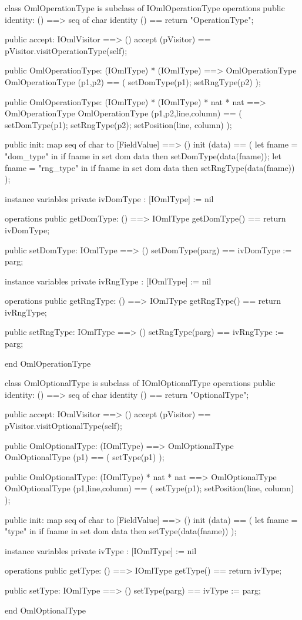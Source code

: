 \begin{vdm_al}
class OmlOperationType is subclass of IOmlOperationType
operations
  public identity: () ==> seq of char
  identity () == return "OperationType";

  public accept: IOmlVisitor ==> ()
  accept (pVisitor) == pVisitor.visitOperationType(self);

  public OmlOperationType:
    (IOmlType) *
    (IOmlType) ==> OmlOperationType
  OmlOperationType (p1,p2) == 
    ( setDomType(p1);
      setRngType(p2) );

  public OmlOperationType:
    (IOmlType) *
    (IOmlType) *
    nat *
    nat ==> OmlOperationType
  OmlOperationType (p1,p2,line,column) == 
    ( setDomType(p1);
      setRngType(p2);
      setPosition(line, column) );

  public init: map seq of char to [FieldValue] ==> ()
  init (data) ==
    ( let fname = "dom_type" in
        if fname in set dom data
        then setDomType(data(fname));
      let fname = "rng_type" in
        if fname in set dom data
        then setRngType(data(fname)) );

instance variables
  private ivDomType : [IOmlType] := nil

operations
  public getDomType: () ==> IOmlType
  getDomType() == return ivDomType;

  public setDomType: IOmlType ==> ()
  setDomType(parg) == ivDomType := parg;

instance variables
  private ivRngType : [IOmlType] := nil

operations
  public getRngType: () ==> IOmlType
  getRngType() == return ivRngType;

  public setRngType: IOmlType ==> ()
  setRngType(parg) == ivRngType := parg;

end OmlOperationType
\end{vdm_al}

\begin{vdm_al}
class OmlOptionalType is subclass of IOmlOptionalType
operations
  public identity: () ==> seq of char
  identity () == return "OptionalType";

  public accept: IOmlVisitor ==> ()
  accept (pVisitor) == pVisitor.visitOptionalType(self);

  public OmlOptionalType:
    (IOmlType) ==> OmlOptionalType
  OmlOptionalType (p1) == 
    ( setType(p1) );

  public OmlOptionalType:
    (IOmlType) *
    nat *
    nat ==> OmlOptionalType
  OmlOptionalType (p1,line,column) == 
    ( setType(p1);
      setPosition(line, column) );

  public init: map seq of char to [FieldValue] ==> ()
  init (data) ==
    ( let fname = "type" in
        if fname in set dom data
        then setType(data(fname)) );

instance variables
  private ivType : [IOmlType] := nil

operations
  public getType: () ==> IOmlType
  getType() == return ivType;

  public setType: IOmlType ==> ()
  setType(parg) == ivType := parg;

end OmlOptionalType
\end{vdm_al}

